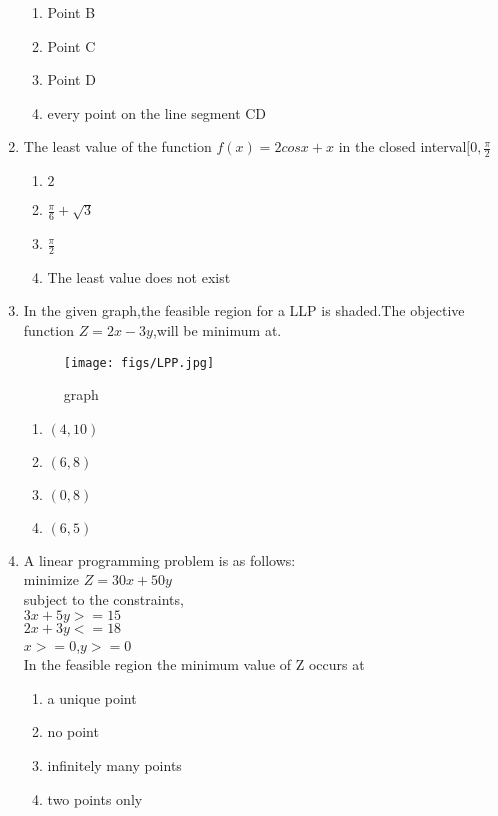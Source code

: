 \documentclass{article}
\begin{document}
\begin{enumerate}
		\begin{enumerate}[label=(\Alph*)]
			\item Point B
			\item Point C
			\item Point D
			\item every point on the line segment CD
		\end{enumerate}
	\item The least value of the function $f(x) = 2cosx + x$ in the closed interval$[0,\frac{\pi}{2}$
		\begin{enumerate}[label=(\Alph*)]
			\item $2$
			\item $\frac{\pi}{6}+\sqrt{3}$
			\item $\frac{\pi}{2}$
			\item The least value does not exist
		\end{enumerate}
	\item In the given graph,the feasible region for a LLP is shaded.The objective function $Z = 2x-3y$,will be minimum at.
		\begin{figure}[H]
		\centering
			\texttt{[image: figs/LPP.jpg]}
			\caption{graph}
			\label{fig:LPP.jpg}
		\end{figure}
		\begin{enumerate}[label=(\Alph*)]
			\item $(4,10)$
			\item $(6,8)$
			\item $(0,8)$
			\item $(6,5)$
		\end{enumerate}
	\item A linear programming problem is as follows:
		\\
		minimize $Z = 30x+50y$ \\
		subject to the constraints, \\
		   $3x+5y>=15$
		\\ $2x+3y<=18$
		\\ $x>=0$,$y>=0$
	\\	In the feasible region the minimum value of Z occurs at
		\\
		\begin{enumerate}[label = (\Alph*)]
			\item a unique point
			\item no point
			\item infinitely many points
			\item two points only
		\end{enumerate}

\end{enumerate}
\end{document}
